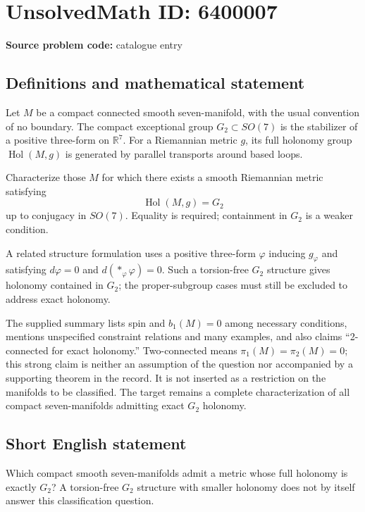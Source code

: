 \documentclass[11pt]{article}
\begin{document}
\section*{UnsolvedMath ID: 6400007}
\textbf{Source problem code:} catalogue entry
\subsection{Definitions and mathematical statement}
Let $M$ be a compact connected smooth seven-manifold, with the usual convention of no boundary. The compact exceptional group $G_2\subset SO(7)$ is the stabilizer of a positive three-form on $\mathbb R^7$. For a Riemannian metric $g$, its full holonomy group $\operatorname{Hol}(M,g)$ is generated by parallel transports around based loops.

Characterize those $M$ for which there exists a smooth Riemannian metric satisfying
\[
\operatorname{Hol}(M,g)=G_2
\]
up to conjugacy in $SO(7)$. Equality is required; containment in $G_2$ is a weaker condition.

A related structure formulation uses a positive three-form $\varphi$ inducing $g_\varphi$ and satisfying $d\varphi=0$ and $d(*_{\varphi}\varphi)=0$. Such a torsion-free $G_2$ structure gives holonomy contained in $G_2$; the proper-subgroup cases must still be excluded to address exact holonomy.

The supplied summary lists spin and $b_1(M)=0$ among necessary conditions, mentions unspecified constraint relations and many examples, and also claims ``2-connected for exact holonomy.'' Two-connected means $\pi_1(M)=\pi_2(M)=0$; this strong claim is neither an assumption of the question nor accompanied by a supporting theorem in the record. It is not inserted as a restriction on the manifolds to be classified. The target remains a complete characterization of all compact seven-manifolds admitting exact $G_2$ holonomy.
\subsection{Short English statement}
Which compact smooth seven-manifolds admit a metric whose full holonomy is exactly $G_2$? A torsion-free $G_2$ structure with smaller holonomy does not by itself answer this classification question.
\end{document}
